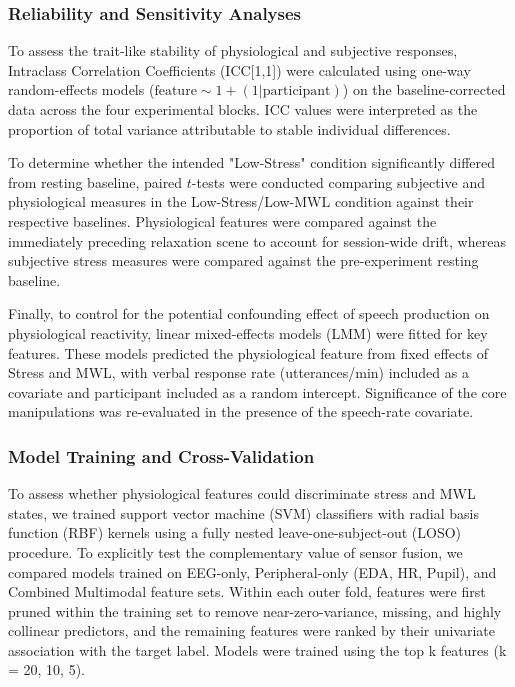 \documentclass[lettersize,journal]{IEEEtran}
\begin{document}
\subsubsection{Reliability and Sensitivity Analyses}
To assess the trait-like stability of physiological and subjective responses, Intraclass Correlation Coefficients (ICC[1,1]) were calculated using one-way random-effects models ($\mathrm{feature} \sim 1 + (1|\mathrm{participant})$) on the baseline-corrected data across the four experimental blocks. ICC values were interpreted as the proportion of total variance attributable to stable individual differences.

To determine whether the intended "Low-Stress" condition significantly differed from resting baseline, paired $t$-tests were conducted comparing subjective and physiological measures in the Low-Stress/Low-MWL condition against their respective baselines. Physiological features were compared against the immediately preceding relaxation scene to account for session-wide drift, whereas subjective stress measures were compared against the pre-experiment resting baseline.

Finally, to control for the potential confounding effect of speech production on physiological reactivity, linear mixed-effects models (LMM) were fitted for key features. These models predicted the physiological feature from fixed effects of Stress and MWL, with verbal response rate (utterances/min) included as a covariate and participant included as a random intercept. Significance of the core manipulations was re-evaluated in the presence of the speech-rate covariate.

\subsubsection{Model Training and Cross-Validation}

To assess whether physiological features could discriminate stress and MWL states, we trained support vector machine (SVM) classifiers with radial basis function (RBF) kernels using a fully nested leave-one-subject-out (LOSO) procedure. 
To explicitly test the complementary value of sensor fusion, we compared models trained on EEG-only, Peripheral-only (EDA, HR, Pupil), and Combined Multimodal feature sets.
Within each outer fold, features were first pruned within the training set to remove near-zero-variance, missing, and highly collinear predictors, and the remaining features were ranked by their univariate association with the target label. Models were trained using the top k features (k = 20, 10, 5).
\end{document}
